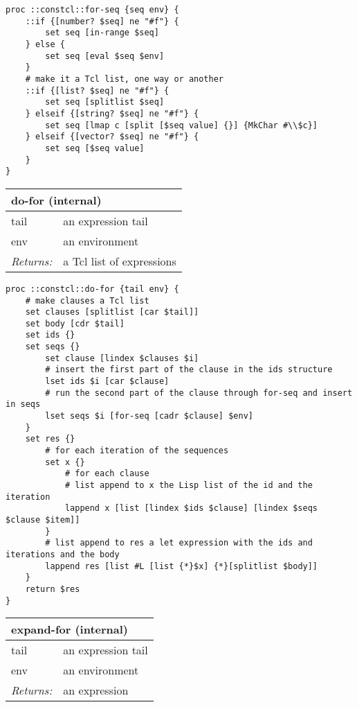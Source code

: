 \documentclass{report}
\begin{document}
\noindent\makebox[\linewidth]{\rule{\linewidth}{0.4pt}}
\begin{lstlisting}
proc ::constcl::for-seq {seq env} {
    ::if {[number? $seq] ne "#f"} {
        set seq [in-range $seq]
    } else {
        set seq [eval $seq $env]
    }
    # make it a Tcl list, one way or another
    ::if {[list? $seq] ne "#f"} {
        set seq [splitlist $seq]
    } elseif {[string? $seq] ne "#f"} { 
        set seq [lmap c [split [$seq value] {}] {MkChar #\\$c}]
    } elseif {[vector? $seq] ne "#f"} {
        set seq [$seq value]
    }
}
\end{lstlisting}
\noindent\makebox[\linewidth]{\rule{\linewidth}{0.4pt}}
\begin{tabular}{ |l l| }
\hline
\multicolumn{2}{|l|}{do-for (internal)} \\
\hline
tail & an expression tail \\
env & an environment \\
\textit{Returns:} & a Tcl list of expressions \\
\hline
\end{tabular}

\noindent\makebox[\linewidth]{\rule{\linewidth}{0.4pt}}
\begin{lstlisting}
proc ::constcl::do-for {tail env} {
    # make clauses a Tcl list
    set clauses [splitlist [car $tail]]
    set body [cdr $tail]
    set ids {}
    set seqs {}
        set clause [lindex $clauses $i]
        # insert the first part of the clause in the ids structure
        lset ids $i [car $clause]
        # run the second part of the clause through for-seq and insert in seqs
        lset seqs $i [for-seq [cadr $clause] $env]
    }
    set res {}
        # for each iteration of the sequences
        set x {}
            # for each clause
            # list append to x the Lisp list of the id and the iteration
            lappend x [list [lindex $ids $clause] [lindex $seqs $clause $item]]
        }
        # list append to res a let expression with the ids and iterations and the body
        lappend res [list #L [list {*}$x] {*}[splitlist $body]]
    }
    return $res
}
\end{lstlisting}
\noindent\makebox[\linewidth]{\rule{\linewidth}{0.4pt}}
\begin{tabular}{ |l l| }
\hline
\multicolumn{2}{|l|}{expand-for (internal)} \\
\hline
tail & an expression tail \\
env & an environment \\
\textit{Returns:} & an expression \\
\hline
\end{tabular}
\end{document}
